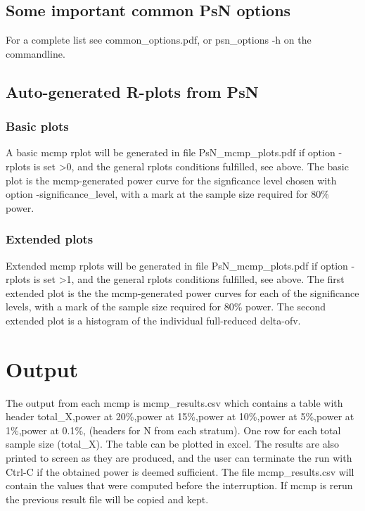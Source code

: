 \subsection{Some important common PsN options}
For a complete list see common\_options.pdf, 
or psn\_options -h on the commandline.


\subsection{Auto-generated R-plots from PsN}
\newcommand{\rplotsconditions}{The default mcmp template 
requires the R library ggplot2.
If the package is not installed then no pdf will be generated,
see the .Rout file in the main run directory for error messages.}


\subsubsection*{Basic plots}
A basic mcmp rplot will be generated in file PsN\_mcmp\_plots.pdf if option -rplots is set >0,
and the general rplots conditions fulfilled, see above.
The basic plot is the mcmp-generated power curve for
the signficance level chosen with option -significance\_level, with a mark at the sample size 
required for 80\% power.
\subsubsection*{Extended plots}
Extended mcmp rplots will be generated in file PsN\_mcmp\_plots.pdf if option -rplots is set >1,
and the general rplots conditions fulfilled, see above.
The first extended plot is the the mcmp-generated power curves for
each of the significance levels, with a mark of the sample size 
required for 80\% power.
The second extended plot is a histogram of the individual full-reduced delta-ofv. 

\section{Output}
The output from each mcmp is mcmp\_results.csv which contains a table with header 
total\_X,power at 20\%,power at 15\%,power at 10\%,power at 5\%,power at 1\%,power at 0.1\%, (headers for N from each stratum). 
One row for each total sample size (total\_X). The table can be plotted in excel. The results are also printed to screen as they are produced, and the user can terminate the run with Ctrl-C if the obtained power is deemed sufficient. The file mcmp\_results.csv will contain the values that were computed before the interruption. If mcmp is rerun the previous result file will be copied and kept.

